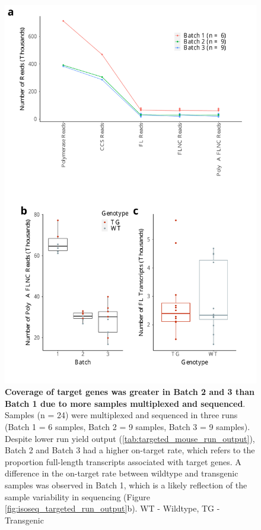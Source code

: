 \begin{figure}[!htp]
	\begin{center}
		\includegraphics[page=2,trim={0 25cm 0 0},clip,scale = 0.55]{Figures/TargetedTranscriptome.pdf}
	\end{center}
	\captionsetup{width=0.95\textwidth}
	\caption[On-Target rate in Transcriptome Iso-Seq runs]%
	{\textbf{Coverage of target genes was greater in Batch 2 and 3 than Batch 1 due to more samples multiplexed and sequenced}. Samples (n = 24) were multiplexed and sequenced in three runs (Batch 1 = 6 samples, Batch 2 = 9 samples, Batch 3 = 9 samples). Despite lower run yield output (\ref{tab:targeted_mouse_run_output}), Batch 2 and Batch 3 had a higher on-target rate, which refers to the proportion full-length transcripts associated with target genes. A difference in the on-target rate between wildtype and transgenic samples was observed in Batch 1, which is a likely reflection of the sample variability in sequencing (Figure \ref{fig:isoseq_targeted_run_output}b). WT - Wildtype, TG - Transgenic}
	\label{fig:isoseq_targeted_rate}
\end{figure}


